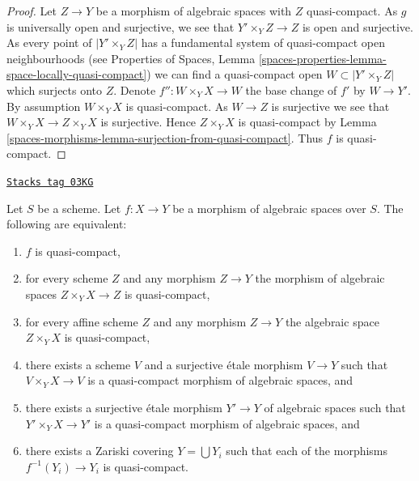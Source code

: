 \begin{proof}
Let $Z \to Y$ be a morphism of algebraic spaces with $Z$ quasi-compact.
As $g$ is universally open and surjective, we see that
$Y' \times_Y Z \to Z$ is open and surjective. As every point of
$|Y' \times_Y Z|$ has a fundamental system of quasi-compact open
neighbourhoods (see
Properties of Spaces,
Lemma \ref{spaces-properties-lemma-space-locally-quasi-compact})
we can find a quasi-compact open $W \subset |Y' \times_Y Z|$
which surjects onto $Z$. Denote
$f'' : W \times_Y X \to W$ the base change of $f'$ by $W \to Y'$.
By assumption $W \times_Y X$ is quasi-compact. As $W \to Z$ is surjective
we see that $W \times_Y X \to Z \times_Y X$ is surjective.
Hence $Z \times_Y X$ is quasi-compact by
Lemma \ref{spaces-morphisms-lemma-surjection-from-quasi-compact}.
Thus $f$ is quasi-compact.
\end{proof}

\begin{lemma}
\label{spaces-morphisms-lemma-quasi-compact-local}
\href{https://stacks.math.columbia.edu/tag/03KG}{\texttt{Stacks tag 03KG}}


Let $S$ be a scheme.
Let $f : X \to Y$ be a morphism of algebraic spaces over $S$.
The following are equivalent:
\begin{enumerate}
\item $f$ is quasi-compact,
\item for every scheme $Z$ and any morphism $Z \to Y$ the morphism of
algebraic spaces $Z \times_Y X \to Z$ is quasi-compact,
\item for every affine scheme $Z$ and any morphism
$Z \to Y$ the algebraic space $Z \times_Y X$ is quasi-compact,
\item there exists a scheme $V$ and a surjective \'etale morphism
$V \to Y$ such that $V \times_Y X \to V$ is a quasi-compact morphism
of algebraic spaces, and
\item there exists a surjective \'etale morphism
$Y' \to Y$ of algebraic spaces such that $Y' \times_Y X \to Y'$
is a quasi-compact morphism of algebraic spaces, and
\item there exists a Zariski covering $Y = \bigcup Y_i$ such that
each of the morphisms $f^{-1}(Y_i) \to Y_i$ is quasi-compact.
\end{enumerate}
\end{lemma}

